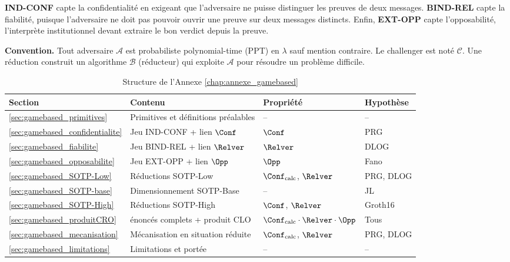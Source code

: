 \begin{sloppypar}
\textbf{IND-CONF} capte la confidentialit\'e en exigeant que l'adversaire ne puisse
distinguer les preuves de deux messages. \textbf{BIND-REL} capte la
fiabilit\'e, puisque l'adversaire ne doit pas pouvoir ouvrir une preuve sur
deux messages distincts. Enfin, \textbf{EXT-OPP} capte l'opposabilit\'e,
l'interpr\`ete institutionnel devant extraire le bon verdict depuis la
preuve.

\noindent\textbf{Convention.} Tout adversaire $\mathcal{A}$ est
probabiliste polynomial-time (PPT) en $\lambda$ sauf mention contraire.
Le challenger est not\'e $\mathcal{C}$. Une r\'eduction construit un
algorithme $\mathcal{B}$ (r\'educteur) qui exploite $\mathcal{A}$ pour
r\'esoudre un probl\`eme difficile.

\begin{table}[htbp]
\centering
\caption{Structure de l'Annexe \ref{chap:annexe_gamebased}}
\label{tab:ann_g_structure}
\small
\begin{tabular}{@{}llll@{}}
\toprule
\textbf{Section} & \textbf{Contenu} & \textbf{Propri\'et\'e}
& \textbf{Hypoth\`ese} \\
\midrule
\ref{sec:gamebased_primitives} & Primitives et d\'efinitions pr\'ealables & -- & -- \\
\ref{sec:gamebased_confidentialite} & Jeu IND-CONF + lien $\Conf$ & $\Conf$ & PRG \\
\ref{sec:gamebased_fiabilite} & Jeu BIND-REL + lien $\Relver$ & $\Relver$ & DLOG \\
\ref{sec:gamebased_opposabilite} & Jeu EXT-OPP + lien $\Opp$ & $\Opp$ & Fano \\
\ref{sec:gamebased_SOTP-Low} & R\'eductions SOTP-Low & $\Conf_{\mathrm{calc}}$, $\Relver$ & PRG, DLOG \\
\ref{sec:gamebased_SOTP-base} & Dimensionnement SOTP-Base & -- & JL \\
\ref{sec:gamebased_SOTP-High} & R\'eductions SOTP-High & $\Conf$, $\Relver$ & Groth16 \\
\ref{sec:gamebased_produitCRO} & \'enonc\'es complets + produit CLO & $\Conf_{\mathrm{calc}}\cdot\Relver\cdot\Opp$ & Tous \\
\ref{sec:gamebased_mecanisation} & M\'ecanisation en situation r\'eduite & $\Conf_{\mathrm{calc}}$, $\Relver$ & PRG, DLOG \\
\ref{sec:gamebased_limitations} & Limitations et port\'ee & -- & -- \\
\bottomrule
\end{tabular}
\end{table}
\end{sloppypar}

